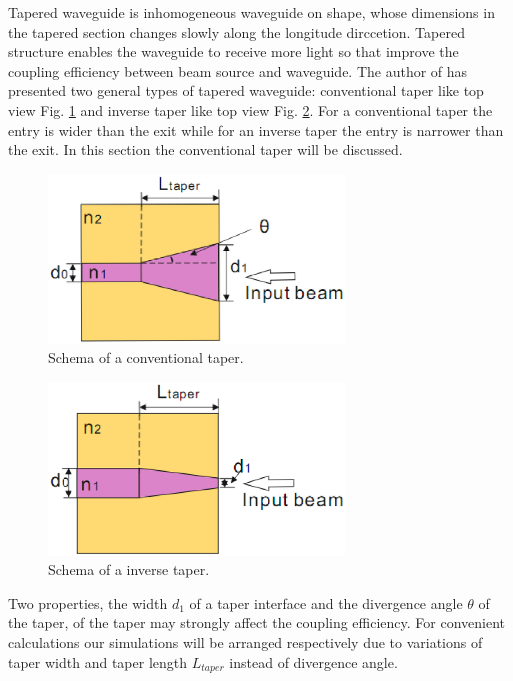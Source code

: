 Tapered waveguide is inhomogeneous waveguide on shape, whose dimensions in the tapered section changes slowly along the longitude dirccetion\cite{linear_tapered_waveguides}. Tapered structure enables the waveguide to receive more light so that improve the coupling efficiency between beam source and waveguide.  
The author of \cite{design_fabrication_tapered_waveguide} has presented two general types of tapered waveguide: conventional taper like top view Fig. \ref{fig:conventional_taper} and inverse taper like top view  Fig. \ref{fig:inverse_taper}. For a conventional taper the entry is wider than the exit while for an inverse taper the entry is narrower than the exit. In this section the conventional taper will be discussed.
\begin{figure}[!ht]
\centering
\includegraphics[width=0.7\textwidth]{bilder/convernational_taper}
\caption{Schema of a conventional taper.}
\label{fig:conventional_taper}
\end{figure}
\begin{figure}[!ht]
\centering
\includegraphics[width=0.7\textwidth]{bilder/inverse_taper}
\caption{Schema of a inverse taper.}
\label{fig:inverse_taper}
\end{figure}

Two properties, the width $d_{1}$ of a taper interface and the divergence angle $\theta$ of the taper, of the taper may strongly affect the coupling efficiency. For convenient calculations our simulations will be arranged respectively due to variations of taper width and taper length $L_{taper}$ instead of divergence angle.
